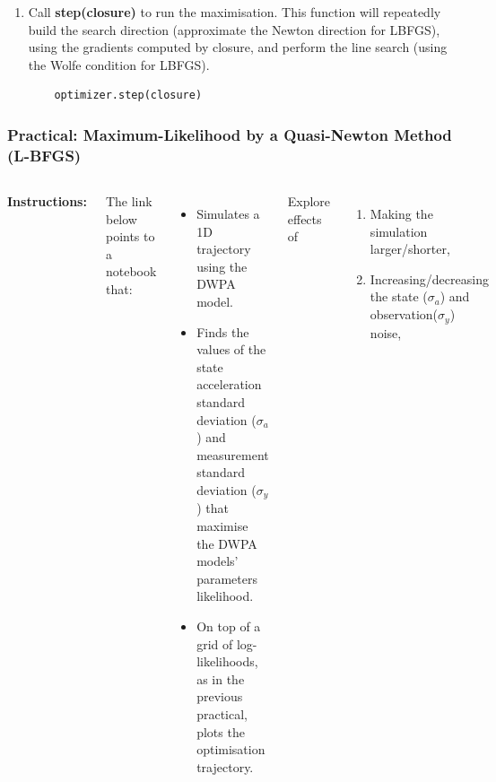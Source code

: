 \begin{frame}
\begin{enumerate}
\item Call \textbf{step(closure)} to run the maximisation. This function will
    repeatedly build the search direction (approximate the Newton direction for
    LBFGS), using the gradients computed by closure, and
    perform the line search (using the Wolfe condition for LBFGS).

			\begin{lstlisting}
    optimizer.step(closure)
			\end{lstlisting}

	\end{enumerate}
\end{frame}

\begin{frame}[fragile,label=plotMLlbfgsColab]
    \frametitle{Practical: Maximum-Likelihood by a Quasi-Newton Method (L-BFGS)}

    \begin{columns}[T]
        \textbf{Instructions:}
        
		\footnotesize

		The link below points to a notebook that:

		\begin{itemize}

			\item Simulates a 1D trajectory using the DWPA model.

            \item Finds the values of the state acceleration standard deviation
                ($\sigma_a$) and measurement standard deviation ($\sigma_y$) that maximise the
                DWPA models' parameters likelihood.

			\item On top of a grid of log-likelihoods, as in the previous
                practical, plots the optimisation trajectory.

		\end{itemize}

		\footnotesize
		Explore effects of

        \begin{enumerate}

            \item Making the simulation larger/shorter,

            \item Increasing/decreasing the state ($\sigma_a$) and
        observation($\sigma_y$) noise,


\end{enumerate}
\end{columns}
\end{frame}
